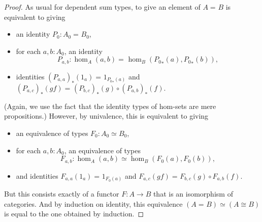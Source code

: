 \documentclass[10pt,a4paper]{article}
\newcommand{\id}[3][]{\ensuremath{#2 =_{#1} #3}\xspace}
\newcommand{\trans}[2]{\ensuremath{{#1}_{*}\mathopen{}\left({#2}\right)\mathclose{}}\xspace}
\newcommand{\eqv}[2]{\ensuremath{#1 \simeq #2}\xspace}
\theoremstyle{definition}
\theoremstyle{remark}
\numberwithin{equation}{section}
\newcommand{\narrowequation}[1]{$#1$}
\begin{document}
\begin{proof}
  As usual for dependent sum types, to give an element of $\id A B$ is equivalent to giving
  \begin{itemize}
  \item an identity $P_0:\id{A_0}{B_0}$,
  \item for each $a,b:A_0$, an identity
    \[P_{a,b}:\id{\hom_A(a,b)}{\hom_B(\trans {P_0} a,\trans {P_0} b)},\]
  \item identities $\id{\trans {(P_{a,a})} {1_a}}{1_{\trans {P_0} a}}$ and
    \narrowequation{\id{\trans {(P_{a,c})} {gf}}{\trans {(P_{b,c})} g \circ \trans {(P_{a,b})} f}.}
  \end{itemize}
  (Again, we use the fact that the identity types of hom-sets are mere propositions.)
  However, by univalence, this is equivalent to giving
  \begin{itemize}
  \item an equivalence of types $F_0:\eqv{A_0}{B_0}$,
  \item for each $a,b:A_0$, an equivalence of types
    \[F_{a,b}:\eqv{\hom_A(a,b)}{\hom_B(F_0 (a),F_0 (b))},\]
  \item and identities $\id{F_{a,a}(1_a)}{1_{F_0 (a)}}$ and $\id{F_{a,c}(gf)}{F_{b,c} (g)\circ F_{a,b} (f)}$.
  \end{itemize}
  But this consists exactly of a functor $F:A\to B$ that is an isomorphism of categories.
  And by induction on identity, this equivalence $\eqv{(\id A B)}{(A\cong B)}$ is equal to the one obtained by induction.
\end{proof}
\end{document}

